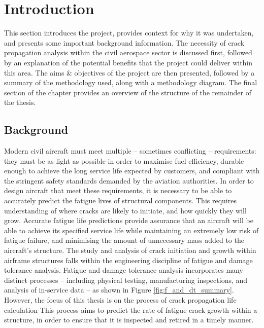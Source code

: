 \chapter{Introduction}\label{cha:introduction}

This section introduces the project, provides context for why it was undertaken, and presents some important background information. The necessity of crack propagation analysis within the civil aerospace sector is discussed first, followed by an explanation of the potential benefits that the project could deliver within this area. The aims \& objectives of the project are then presented, followed by a summary of the methodology used, along with a methodology diagram. The final section of the chapter provides an overview of the structure of the remainder of the thesis.

\newpage
\section{Background}\label{sec:background}

Modern civil aircraft must meet multiple -- sometimes conflicting -- requirements: they must be as light as possible in order to maximise fuel efficiency, durable enough to achieve the long service life expected by customers, and compliant with the stringent safety standards demanded by the aviation authorities. In order to design aircraft that meet these requirements, it is necessary to be able to accurately predict the fatigue lives of structural components. This requires understanding of where cracks are likely to initiate, and how quickly they will grow. Accurate fatigue life predictions provide assurance that an aircraft will be able to achieve its specified service life while maintaining an extremely low risk of fatigue failure, and minimising the amount of unnecessary mass added to the aircraft's structure. The study and analysis of crack initiation and growth within airframe structures falls within the engineering discipline of fatigue and damage tolerance analysis. Fatigue and damage tolerance analysis incorporates many distinct processes --  including physical testing,  manufacturing inspections, and analysis of in-service data -- as shown in Figure \ref{fig:f_and_dt_summary}. However, the focus of this thesis is on the process of crack propagation life calculation This process aims to predict the rate of fatigue crack growth within a structure, in order to ensure that it is inspected and retired in a timely manner.

